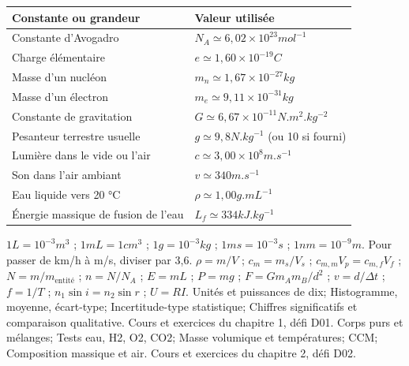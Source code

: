 \begin{tabularx}{\linewidth}{@{}YY@{}}\toprule
Constante ou grandeur & Valeur utilisée\\\midrule
Constante d'Avogadro & $N_A\simeq6,02\times10^{23}\unit{mol^{-1}}$\\
Charge élémentaire & $e\simeq1,60\times10^{-19}\unit{C}$\\
Masse d'un nucléon & $m_n\simeq1,67\times10^{-27}\unit{kg}$\\
Masse d'un électron & $m_e\simeq9,11\times10^{-31}\unit{kg}$\\
Constante de gravitation & $G\simeq6,67\times10^{-11}\unit{N.m^2.kg^{-2}}$\\
Pesanteur terrestre usuelle & $g\simeq9,8\unit{N.kg^{-1}}$ (ou 10 si fourni)\\
Lumière dans le vide ou l'air & $c\simeq3,00\times10^8\unit{m.s^{-1}}$\\
Son dans l'air ambiant & $v\simeq340\unit{m.s^{-1}}$\\
Eau liquide vers 20 °C & $\rho\simeq1,00\unit{g.mL^{-1}}$\\
Énergie massique de fusion de l'eau & $L_f\simeq334\unit{kJ.kg^{-1}}$\\\bottomrule
\end{tabularx}
$1\unit{L}=10^{-3}\unit{m^3}$ ; $1\unit{mL}=1\unit{cm^3}$ ; $1\unit{g}=10^{-3}\unit{kg}$ ; $1\unit{ms}=10^{-3}\unit{s}$ ; $1\unit{nm}=10^{-9}\unit{m}$. Pour passer de km/h à m/s, diviser par 3,6.
$\rho=m/V$ ; $c_m=m_s/V_s$ ; $c_{m,m}V_p=c_{m,f}V_f$ ; $N=m/m_{\mathrm{entité}}$ ; $n=N/N_A$ ; $E=mL$ ; $P=mg$ ; $F=Gm_Am_B/d^2$ ; $v=d/\Delta t$ ; $f=1/T$ ; $n_1\sin i=n_2\sin r$ ; $U=RI$.
Unités et puissances de dix; Histogramme, moyenne, écart-type; Incertitude-type statistique; Chiffres significatifs et comparaison qualitative. Cours et exercices du chapitre 1, défi D01.
Corps purs et mélanges; Tests eau, H2, O2, CO2; Masse volumique et températures; CCM; Composition massique et air. Cours et exercices du chapitre 2, défi D02.
